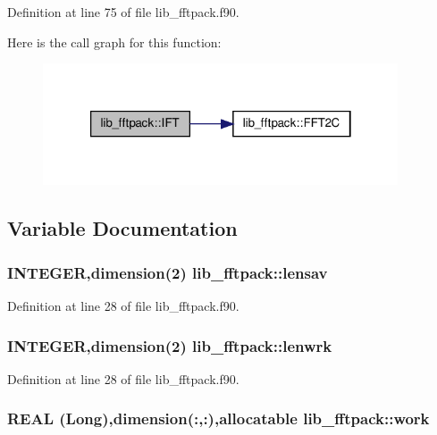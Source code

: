 Definition at line 75 of file lib\_\-fftpack.f90.



Here is the call graph for this function:\nopagebreak
\begin{figure}[H]
\begin{center}
\leavevmode
\includegraphics[width=298pt]{namespacelib__fftpack_af56d1d1be2bb706b859f005211a0c456_cgraph}
\end{center}
\end{figure}




\subsection{Variable Documentation}
\hypertarget{namespacelib__fftpack_ad1ac8096e29c8f4d4eccbbcd5ff74bf1}{
\subsubsection[{lensav}]{\setlength{\rightskip}{0pt plus 5cm}INTEGER,dimension(2) {\bf lib\_\-fftpack::lensav}}}
\label{namespacelib__fftpack_ad1ac8096e29c8f4d4eccbbcd5ff74bf1}


Definition at line 28 of file lib\_\-fftpack.f90.

\hypertarget{namespacelib__fftpack_af22a24940af26c19850b9add69cc2adf}{
\subsubsection[{lenwrk}]{\setlength{\rightskip}{0pt plus 5cm}INTEGER,dimension(2) {\bf lib\_\-fftpack::lenwrk}}}
\label{namespacelib__fftpack_af22a24940af26c19850b9add69cc2adf}


Definition at line 28 of file lib\_\-fftpack.f90.

\hypertarget{namespacelib__fftpack_ac4c893477b0614d957edb4530d018191}{
\subsubsection[{work}]{\setlength{\rightskip}{0pt plus 5cm}REAL (Long),dimension(:,:),allocatable {\bf lib\_\-fftpack::work}}}
\label{namespacelib__fftpack_ac4c893477b0614d957edb4530d018191}



